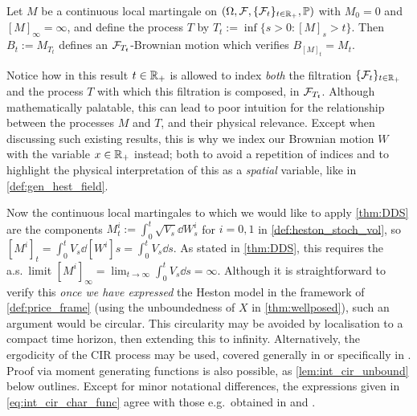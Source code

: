 \begin{theorem}\label{thm:DDS}
    Let $M$ be a continuous local martingale on $(\Omega,\mathcal{F},\{\mathcal{F}_t\}_{t\in\mathbb{R}_+},\mathbb{P})$ with $M_0=0$ and $[M]_\infty=\infty$, and define the process $T$ by $T_t:=\inf\{s>0:[M]_s>t\}$. Then $B_t:=M_{T_t}$ defines an $\mathcal{F}_{T_t}$-Brownian motion which verifies $B_{[M]_t}=M_t$.
\end{theorem}

Notice how in this result $t\in\mathbb{R}_+$ is allowed to index \emph{both} the filtration $\{\mathcal{F}_t\}_{t\in\mathbb{R}_+}$ and the process $T$ with which this filtration is composed, in $\mathcal{F}_{T_t}$. Although mathematically palatable, this can lead to poor intuition for the relationship between the processes $M$ and $T$, and their physical relevance. Except when discussing such existing results, this is why we index our Brownian motion $W$ with the variable $x\in\mathbb{R}_+$ instead; both to avoid a repetition of indices and to highlight the physical interpretation of this as a \emph{spatial} variable, like in \autoref{def:gen_hest_field}.

Now the continuous local martingales to which we would like to apply \autoref{thm:DDS} are the components $M^i_t:=\int_0^t \sqrt{V_s}\dd W^i_s$ for $i=0,1$ in \autoref{def:heston_stoch_vol}, so $[M^i]_t=\int_0^t V_s\dd [W^i]s=\int_0^t V_s\dd s$. As stated in \autoref{thm:DDS}, this requires the a.s.~limit $[M^i]_\infty=\lim_{t\to\infty}\int_0^t V_s\dd s=\infty$. Although it is straightforward to verify this \emph{once we have expressed} the Heston model in the framework of \autoref{def:price_frame} (using the unboundedness of $X$ in \autoref{thm:wellposed}), such an argument would be circular. This circularity may be avoided by localisation to a compact time horizon, then extending this to infinity. Alternatively, the ergodicity of the CIR process may be used, covered generally in \cite{papoulis_2002} or specifically in \cite{jin_2019}. Proof via moment generating functions is also possible, as \autoref{lem:int_cir_unbound} below outlines. Except for minor notational differences, the expressions given in \autoref{eq:int_cir_char_func} agree with those e.g.~obtained in \cite{dufresne_2001} and \cite{carr_2003}.

